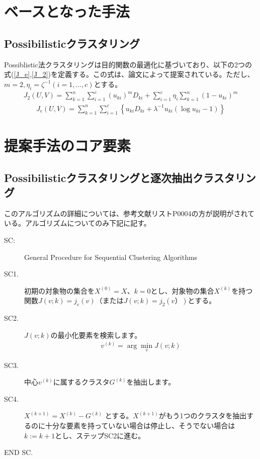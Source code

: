 \documentclass[10pt,onecolumn]{jsarticle}
\begin{document}
\section{ベースとなった手法}
\subsection{Possibilisticクラスタリング}
Possiblistic法クラスタリングは目的関数の最適化に基づいており、以下の2つの式(\ref{J_e},\ref{J_2})を定義する。この式は、論文\cite{ref1}によって提案されている。ただし、$m=2,\eta_{i}=\zeta^{-1}(i=1, \ldots, c)$とする。
\begin{align}
	\label{J_2}
	J_{2}(U, V)=\sum_{k=1}^{n} \sum_{i=1}^{c}\left(u_{k i}\right)^{m} D_{k i}+\sum_{i=1}^{c} \eta_{i} \sum_{k=1}^{n}\left(1-u_{k i}\right)^{m}
\end{align}
\begin{align}
	\label{J_e}
	J_{e}(U, V)=\sum_{k=1}^{n} \sum_{i=1}^{c}\left\{u_{k i} D_{k i}+\lambda^{-1} u_{k i}\left(\log u_{k i}-1\right)\right\}
\end{align}
\section{提案手法のコア要素}
\subsection{Possibilisticクラスタリングと逐次抽出クラスタリング}
このアルゴリズムの詳細については、参考文献リストP0004の方が説明がされている。アルゴリズムについてのみ下記に記す。
\begin{description}
	\item[SC:] General Procedure for Sequential Clustering Algorithms
	\item[SC1.] 初期の対象物の集合を$X^{(0)}= X$、$k= 0$とし、対象物の集合$X^{(k)}$を持つ関数$J(v;k)= j_e(v)$（または$J(v;k)= j_2(v）)$とする。
	\item[SC2.]$J(v;k)$の最小化要素を検索します。
	\begin{align}
		v^{(k)}=\arg \min _{v} J(v ; k)
	\end{align}
	\item[SC3.]中心$v^{(k)}$に属するクラスタ$G^{(k)}$を抽出します。
	\item[SC4.]$X^{(k+1)} = X^{(k)} - G^{(k)}$ とする。$X^{(k+1)}$がもう1つのクラスタを抽出するのに十分な要素を持っていない場合は停止し、そうでない場合は$k := k +1$とし、ステップSC2に進む。
	\item[END SC.]
\end{description}
\end{document}
